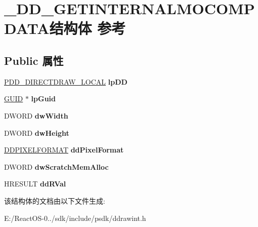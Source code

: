 \hypertarget{struct___d_d___g_e_t_i_n_t_e_r_n_a_l_m_o_c_o_m_p_d_a_t_a}{}\section{\+\_\+\+D\+D\+\_\+\+G\+E\+T\+I\+N\+T\+E\+R\+N\+A\+L\+M\+O\+C\+O\+M\+P\+D\+A\+T\+A结构体 参考}
\label{struct___d_d___g_e_t_i_n_t_e_r_n_a_l_m_o_c_o_m_p_d_a_t_a}
\subsection*{Public 属性}
\begin{DoxyCompactItemize}
\item 
\mbox{\label{struct___d_d___g_e_t_i_n_t_e_r_n_a_l_m_o_c_o_m_p_d_a_t_a_a6d96fe580de1a347685905cae5e34461}} 
\hyperlink{struct___d_d___d_i_r_e_c_t_d_r_a_w___l_o_c_a_l}{P\+D\+D\+\_\+\+D\+I\+R\+E\+C\+T\+D\+R\+A\+W\+\_\+\+L\+O\+C\+AL} {\bfseries lp\+DD}
\item 
\mbox{\label{struct___d_d___g_e_t_i_n_t_e_r_n_a_l_m_o_c_o_m_p_d_a_t_a_af86847dd83640634bb6d0181e987e550}} 
\hyperlink{interface_g_u_i_d}{G\+U\+ID} $\ast$ {\bfseries lp\+Guid}
\item 
\mbox{\label{struct___d_d___g_e_t_i_n_t_e_r_n_a_l_m_o_c_o_m_p_d_a_t_a_adf593069eb4450d65646615f6d1da5ba}} 
D\+W\+O\+RD {\bfseries dw\+Width}
\item 
\mbox{\label{struct___d_d___g_e_t_i_n_t_e_r_n_a_l_m_o_c_o_m_p_d_a_t_a_aa4ad285a502862d8e43ce6929e4e31bd}} 
D\+W\+O\+RD {\bfseries dw\+Height}
\item 
\mbox{\label{struct___d_d___g_e_t_i_n_t_e_r_n_a_l_m_o_c_o_m_p_d_a_t_a_acfca9e29848246aa7eec70e04710b21f}} 
\hyperlink{struct___d_d_p_i_x_e_l_f_o_r_m_a_t}{D\+D\+P\+I\+X\+E\+L\+F\+O\+R\+M\+AT} {\bfseries dd\+Pixel\+Format}
\item 
\mbox{\label{struct___d_d___g_e_t_i_n_t_e_r_n_a_l_m_o_c_o_m_p_d_a_t_a_a1c85448dc00dbc876ef633953a7640a9}} 
D\+W\+O\+RD {\bfseries dw\+Scratch\+Mem\+Alloc}
\item 
\mbox{\label{struct___d_d___g_e_t_i_n_t_e_r_n_a_l_m_o_c_o_m_p_d_a_t_a_abfb9a6372bff6758e80a19a062c14d11}} 
H\+R\+E\+S\+U\+LT {\bfseries dd\+R\+Val}
\end{DoxyCompactItemize}


该结构体的文档由以下文件生成\+:\begin{DoxyCompactItemize}
\item 
E\+:/\+React\+O\+S-\/0../sdk/include/psdk/ddrawint.\+h\end{DoxyCompactItemize}
